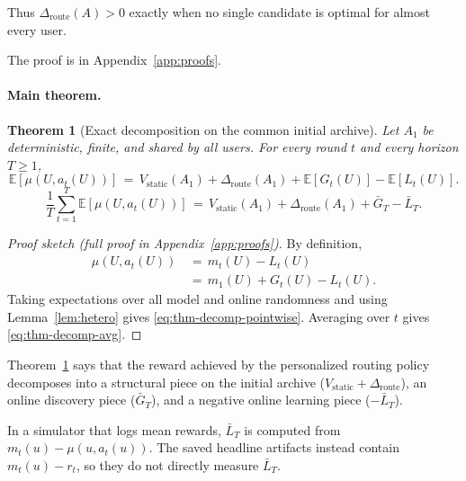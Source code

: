 \documentclass{article} %
\newtheorem{theorem}{Theorem}
\providecommand{\E}{\mathbb{E}}
\begin{document}
Thus \(\Delta_{\mathrm{route}}(A)>0\) exactly when no single candidate is
optimal for almost every user.

The proof is in Appendix~\ref{app:proofs}.

\paragraph{Main theorem.}

\label{sec:method-thm-decomp}

\begin{theorem}[Exact decomposition on the common initial archive]
\label{thm:decomp}
Let $A_1$ be deterministic, finite, and shared by all users. For every round $t$ and every horizon $T \ge 1$,
\begin{equation}
\label{eq:thm-decomp-pointwise}
\E[\mu(U, a_t(U))]
\,=\, V_{\mathrm{static}}(A_1) + \Delta_{\mathrm{route}}(A_1) + \E[G_t(U)] - \E[L_t(U)].
\end{equation}
\begin{equation}
\label{eq:thm-decomp-avg}
\frac{1}{T}\sum_{t=1}^T \E[\mu(U, a_t(U))]
\,=\, V_{\mathrm{static}}(A_1) + \Delta_{\mathrm{route}}(A_1) + \bar G_T - \bar L_T.
\end{equation}
\end{theorem}

\begin{proof}[Proof sketch (full proof in Appendix~\ref{app:proofs})]
By definition,
\begin{equation*}
\begin{aligned}
\mu(U,a_t(U))
&\,=\,m_t(U)-L_t(U)\\
&\,=\,m_1(U)+G_t(U)-L_t(U).
\end{aligned}
\end{equation*}
Taking expectations over all model and online randomness and using
Lemma~\ref{lem:hetero} gives \eqref{eq:thm-decomp-pointwise}. Averaging over
$t$ gives \eqref{eq:thm-decomp-avg}.
\end{proof}

Theorem~\ref{thm:decomp} says that the reward achieved by the personalized routing policy decomposes into a structural piece on the initial archive ($V_{\mathrm{static}}+\Delta_{\mathrm{route}}$), an online discovery piece ($\bar G_T$), and a negative online learning piece ($-\bar L_T$).

In a simulator that logs mean rewards, \(\bar L_T\) is computed from
\(m_t(u)-\mu(u,a_t(u))\). The saved headline artifacts instead contain
\(m_t(u)-r_t\), so they do not directly measure \(\bar L_T\).
\end{document}

